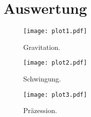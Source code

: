 \section{Auswertung}
\label{sec:Auswertung}

\begin{figure}
  \centering
  \texttt{[image: plot1.pdf]}
  \caption{Gravitation.}
  \label{fig:plot}
\end{figure}

\begin{figure}
  \centering
  \texttt{[image: plot2.pdf]}
  \caption{Schwingung.}
  \label{fig:plot}
\end{figure}

\begin{figure}
  \centering
  \texttt{[image: plot3.pdf]}
  \caption{Präzession.}
  \label{fig:plot}
\end{figure}
